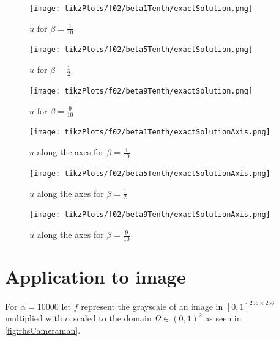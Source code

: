 \documentclass[draft=false,twoside,12pt]{scrreprt}
\begin{document}
\vspace{-\parskip}
\begin{minipage}[t]{0.3\textwidth}
  \begin{figure}[H]
	  \centering
    \texttt{[image: tikzPlots/f02/beta1Tenth/exactSolution.png]} 
    \caption{$u$ for $\beta=\frac{1}{10}$}
  \end{figure}
\end{minipage}
\hfill
\vline
\hfill
\begin{minipage}[t]{0.3\textwidth}
  \begin{figure}[H]
	  \centering
    \texttt{[image: tikzPlots/f02/beta5Tenth/exactSolution.png]} 
    \caption{$u$ for $\beta=\frac{1}{2}$}
  \end{figure}
\end{minipage}
\hfill
\vline
\hfill
\begin{minipage}[t]{0.3\textwidth}
  \begin{figure}[H]
	  \centering
    \texttt{[image: tikzPlots/f02/beta9Tenth/exactSolution.png]} 
    \caption{$u$ for $\beta=\frac{9}{10}$}
  \end{figure}
\end{minipage}

\vspace{-\parskip}
\begin{minipage}[t]{0.3\textwidth}
  \begin{figure}[H]
	  \centering
		\texttt{[image: tikzPlots/f02/beta1Tenth/exactSolutionAxis.png]} 
    \caption{$u$ along the axes for $\beta=\frac{1}{10}$}
  \end{figure}
\end{minipage}
\hfill
\vline
\hfill
\begin{minipage}[t]{0.3\textwidth}
  \begin{figure}[H]
	  \centering
		\texttt{[image: tikzPlots/f02/beta5Tenth/exactSolutionAxis.png]} 
    \caption{$u$ along the axes for $\beta=\frac{1}{2}$}
  \end{figure}
\end{minipage}
\hfill
\vline
\hfill
\begin{minipage}[t]{0.3\textwidth}
  \begin{figure}[H]
	  \centering
		\texttt{[image: tikzPlots/f02/beta9Tenth/exactSolutionAxis.png]} 
    \caption{$u$ along the axes for $\beta=\frac{9}{10}$}
  \end{figure}
\end{minipage}

\section{Application to image}
For $\alpha = 10000$ let $f$ represent the grayscale of an image in
$[0,1]^{256\times 256}$ multiplied with $\alpha$ scaled to the domain
$\Omega\in(0,1)^2$ as seen in \cref{fig:rhsCameraman}.
\end{document}
